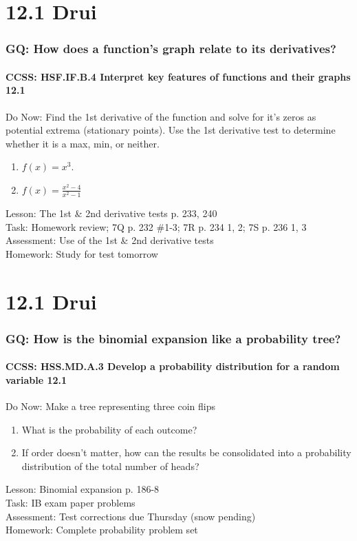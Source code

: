 \documentclass{beamer}
\begin{document}
  \section{12.1 Drui}
  \frame
  {
    \frametitle{GQ: How does a function's graph relate to its derivatives?}
    \framesubtitle{CCSS: HSF.IF.B.4 Interpret key features of functions and their graphs \qquad \alert{12.1}}

    \begin{block}{Do Now: Find the 1st derivative of the function and solve for it's zeros as potential extrema (stationary points). Use the 1st derivative test to determine whether it is a max, min, or neither.}
    \begin{enumerate}
        \item $f(x)=x^3$.
        \item $\displaystyle f(x)=\frac{x^2-4}{x^2-1}$
    \end{enumerate}
    \end{block}
    Lesson: The 1st \& 2nd derivative tests p. 233, 240\\%
    Task: Homework review; 7Q p. 232 \#1-3; 7R p. 234 1, 2; 7S p. 236 1, 3 \\%
    Assessment: Use of the 1st \& 2nd derivative tests
    \\%
    Homework: Study for test \alert{tomorrow}
  }

  \section{12.1 Drui}
  \frame
  {
    \frametitle{GQ: How is the binomial expansion like a probability tree?}
    \framesubtitle{CCSS: HSS.MD.A.3 Develop a probability distribution for a random variable \qquad \alert{12.1}}

    \begin{block}{Do Now: Make a tree representing three coin flips}
    \begin{enumerate}
        \item What is the probability of each outcome?
        \item If order doesn't matter, how can the results be consolidated into a probability distribution of the total number of heads?
    \end{enumerate}
    \end{block}
    Lesson:  Binomial expansion p. 186-8\\%
    Task: IB exam paper problems\\%
    Assessment: Test corrections due Thursday (snow pending)
    \\%
    Homework: Complete probability problem set
  }
\end{document}
